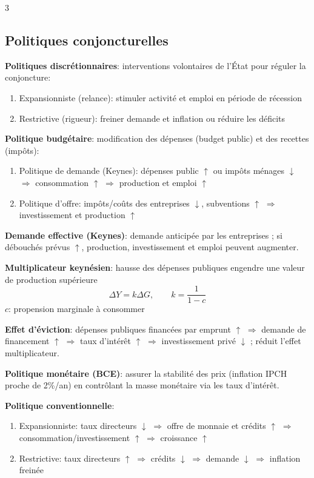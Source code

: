 \documentclass[12pt, a4paper]{article}
\begin{document}
\begin{multicols*}{3}
\subsection{Politiques conjoncturelles}

\textbf{Politiques discrétionnaires}: interventions volontaires de l'État pour réguler la conjoncture: 
\begin{enumerate}[\roman*.]
  \item Expansionniste (relance): stimuler activité et emploi en période de récession
  \item Restrictive (rigueur): freiner demande et inflation ou réduire les déficits
\end{enumerate}

\textbf{Politique budgétaire}: modification des dépenses (budget public) et des recettes (impôts):
\begin{enumerate}[\roman*.]
  \item Politique de demande (Keynes): dépenses public $\uparrow$ ou impôts ménages $\downarrow$ $\Rightarrow$ consommation $\uparrow$ $\Rightarrow$ production et emploi $\uparrow$
  \item Politique d'offre: impôts/coûts des entreprises $\downarrow$, subventions $\uparrow$ $\Rightarrow$ investissement et production $\uparrow$ 
\end{enumerate}

\textbf{Demande effective (Keynes)}: demande anticipée par les entreprises ; si débouchés prévus $\uparrow$, production, investissement et emploi peuvent augmenter.

\textbf{Multiplicateur keynésien}: hausse des dépenses publiques engendre une valeur de production supérieure 
\[
\boxed{\Delta Y=k\Delta G,\qquad k=\frac{1}{1-c}}
\]
$c$: propension marginale à consommer 

\textbf{Effet d'éviction}: dépenses publiques financées par emprunt $\uparrow$ $\Rightarrow$ demande de financement $\uparrow$ $\Rightarrow$ taux d'intérêt $\uparrow$ $\Rightarrow$ investissement privé $\downarrow$ ; réduit l'effet multiplicateur.

\colbreak
\textbf{Politique monétaire (BCE)}: assurer la stabilité des prix (inflation IPCH proche de 2\%/an) en contrôlant la masse monétaire via les taux d'intérêt.

\textbf{Politique conventionnelle}:
\begin{enumerate}[\roman*.]
  \item Expansionniste: taux directeurs $\downarrow$ $\Rightarrow$ offre de monnaie et crédits $\uparrow$ $\Rightarrow$ consommation/investissement $\uparrow$ $\Rightarrow$ croissance $\uparrow$
  \item Restrictive: taux directeurs $\uparrow$ $\Rightarrow$ crédits $\downarrow$ $\Rightarrow$ demande $\downarrow$ $\Rightarrow$ inflation freinée
\end{enumerate}


\end{multicols*}
\end{document}
